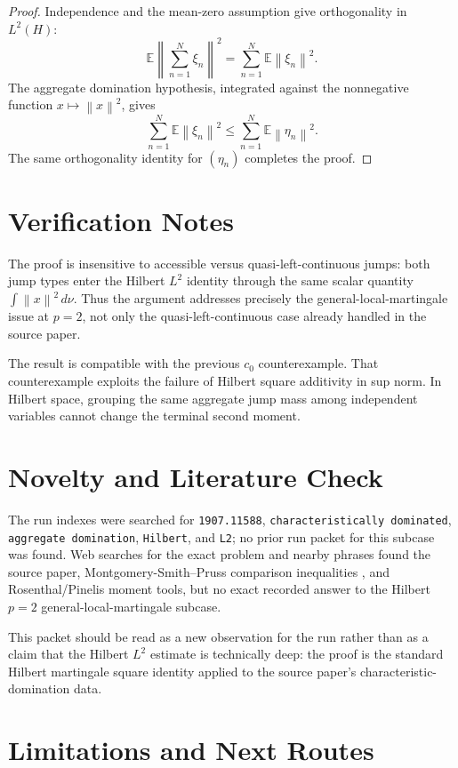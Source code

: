 \documentclass[11pt]{article}
\newcommand{\E}{\mathbb E}
\newcommand{\norm}[1]{\left\lVert #1\right\rVert}
\begin{document}
\begin{proof}
Independence and the mean-zero assumption give orthogonality in \(L^2(H)\):
\[
  \E\norm{\sum_{n=1}^N \xi_n}^2
  =
  \sum_{n=1}^N \E\norm{\xi_n}^2.
\]
The aggregate domination hypothesis, integrated against the nonnegative
function \(x\mapsto\norm{x}^2\), gives
\[
  \sum_{n=1}^N \E\norm{\xi_n}^2
  \leq
  \sum_{n=1}^N \E\norm{\eta_n}^2.
\]
The same orthogonality identity for \((\eta_n)\) completes the proof.
\end{proof}

\section*{Verification Notes}

The proof is insensitive to accessible versus quasi-left-continuous jumps:
both jump types enter the Hilbert \(L^2\) identity through the same scalar
quantity \(\int\norm{x}^2\,d\nu\).  Thus the argument addresses precisely the
general-local-martingale issue at \(p=2\), not only the quasi-left-continuous
case already handled in the source paper.

The result is compatible with the previous \(c_0\) counterexample.  That
counterexample exploits the failure of Hilbert square additivity in sup norm.
In Hilbert space, grouping the same aggregate jump mass among independent
variables cannot change the terminal second moment.

\section*{Novelty and Literature Check}

The run indexes were searched for \texttt{1907.11588},
\texttt{characteristically dominated}, \texttt{aggregate domination},
\texttt{Hilbert}, and \texttt{L2}; no prior run packet for this subcase was
found.  Web searches for the exact problem and nearby phrases found the source
paper, Montgomery-Smith--Pruss comparison inequalities
\cite{MontgomerySmithPruss2001}, and Rosenthal/Pinelis moment tools, but no
exact recorded answer to the Hilbert \(p=2\) general-local-martingale subcase.

This packet should be read as a new observation for the run rather than as a
claim that the Hilbert \(L^2\) estimate is technically deep: the proof is the
standard Hilbert martingale square identity applied to the source paper's
characteristic-domination data.

\section*{Limitations and Next Routes}
\end{document}
